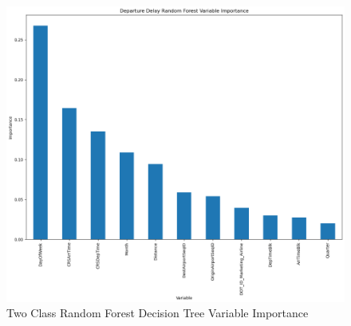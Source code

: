 \documentclass[a4paper,12pt]{article}
\begin{document}
\begin{figure}[!]
    \centering
    \includegraphics*[scale=.50]{../../img/model_rq2_rf.png}
    \caption[]{Two Class Random Forest Decision Tree Variable Importance}
    \label{fig:model:rq2:rfc_1}
\end{figure}
\end{document}
